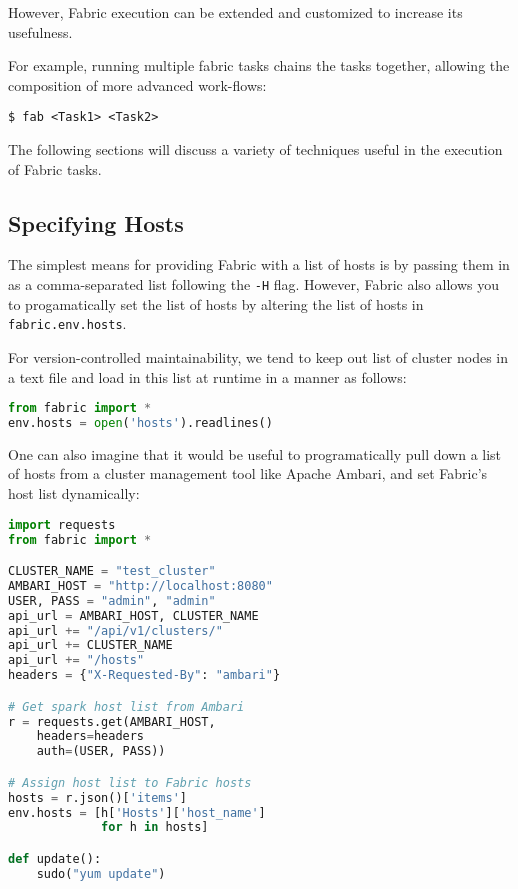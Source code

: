 \documentclass[9pt,twocolumn,twoside]{idsi}
\begin{document}
However, Fabric execution can be extended and customized to increase its usefulness.

For example, running multiple fabric tasks chains the tasks together, allowing the composition of more advanced work-flows:
\begin{verbatim}
$ fab <Task1> <Task2>
\end{verbatim}

The following sections will discuss a variety of techniques useful in the execution of Fabric tasks. 

\subsection{Specifying Hosts}
The simplest means for providing Fabric with a list of hosts is by passing them in as a comma-separated list following the \texttt{-H} flag. However, Fabric also allows you to progamatically set the list of hosts by altering the list of hosts in \texttt{fabric.env.hosts}.

For version-controlled maintainability, we tend to keep out list of cluster nodes in a text file and load in this list at runtime in a manner as follows:
\begin{lstlisting}[language=Python, showstringspaces=false]
from fabric import *
env.hosts = open('hosts').readlines()
\end{lstlisting}

One can also imagine that it would be useful to programatically pull down a list of hosts from a cluster management tool like Apache Ambari, and set Fabric's host list dynamically:

\begin{lstlisting}[language=Python, showstringspaces=false, breaklines=true]
import requests
from fabric import *

CLUSTER_NAME = "test_cluster"
AMBARI_HOST = "http://localhost:8080"
USER, PASS = "admin", "admin"
api_url = AMBARI_HOST, CLUSTER_NAME
api_url += "/api/v1/clusters/"
api_url += CLUSTER_NAME
api_url += "/hosts"
headers = {"X-Requested-By": "ambari"}

# Get spark host list from Ambari
r = requests.get(AMBARI_HOST,
    headers=headers
    auth=(USER, PASS))

# Assign host list to Fabric hosts
hosts = r.json()['items']
env.hosts = [h['Hosts']['host_name']
             for h in hosts]

def update():
    sudo("yum update")
\end{lstlisting}
\end{document}
